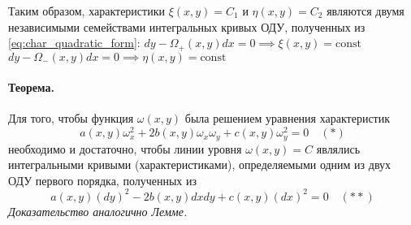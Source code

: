 \documentclass[12pt, a4paper]{article}
\begin{document}
Таким образом, характеристики $\xi(x,y)=C_1$ и $\eta(x,y)=C_2$ являются двумя независимыми семействами интегральных кривых ОДУ, полученных из \eqref{eq:char_quadratic_form}:
$dy - \Omega_+(x,y)dx = 0 \implies \xi(x,y) = \text{const}$
$dy - \Omega_-(x,y)dx = 0 \implies \eta(x,y) = \text{const}$

\paragraph{Теорема.} Для того, чтобы функция $\omega(x,y)$ была решением уравнения характеристик
\begin{equation} \label{eq:char_pde_again}
a(x,y)\omega_x^2 + 2b(x,y)\omega_x\omega_y + c(x,y)\omega_y^2 = 0 \quad (*)
\end{equation}
необходимо и достаточно, чтобы линии уровня $\omega(x,y)=C$ являлись интегральными кривыми (характеристиками), определяемыми одним из двух ОДУ первого порядка, полученных из
\begin{equation} \label{eq:char_quadratic_form_again}
a(x,y)(dy)^2 - 2b(x,y)dxdy + c(x,y)(dx)^2 = 0 \quad (**)
\end{equation}
\textit{Доказательство аналогично Лемме.}

\end{document}
